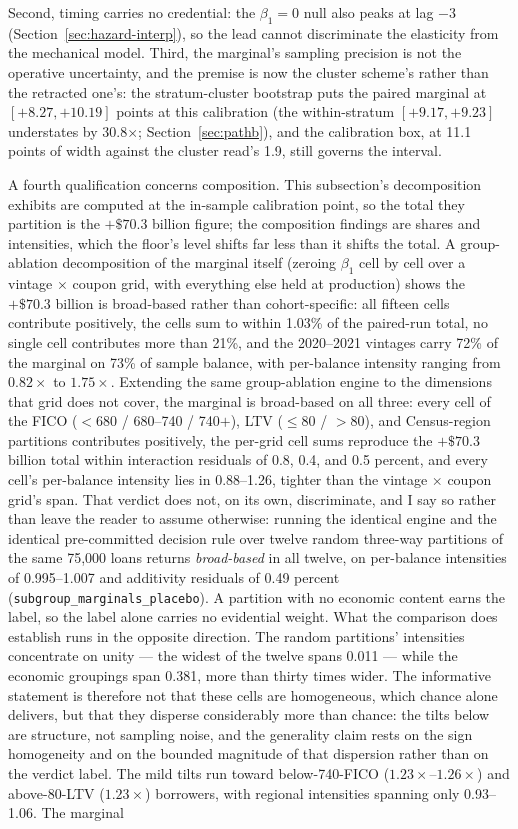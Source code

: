 \documentclass[12pt]{article}
\begin{document}
Second, timing carries no credential: the $\beta_1 = 0$ null also peaks at lag $-3$ (Section~\ref{sec:hazard-interp}), so the lead cannot discriminate the elasticity from the mechanical model. Third, the marginal's sampling precision is not the operative uncertainty, and the premise is now the cluster scheme's rather than the retracted one's: the stratum-cluster bootstrap puts the paired marginal at $[+8.27, +10.19]$ points at this calibration (the within-stratum $[+9.17, +9.23]$ understates by 30.8$\times$; Section~\ref{sec:pathb}), and the calibration box, at 11.1 points of width against the cluster read's 1.9, still governs the interval.

A fourth qualification concerns composition. This subsection's decomposition exhibits are computed at the in-sample calibration point, so the total they partition is the $+\$70.3$ billion figure; the composition findings are shares and intensities, which the floor's level shifts far less than it shifts the total. A group-ablation decomposition of the marginal itself (zeroing $\beta_1$ cell by cell over a vintage $\times$ coupon grid, with everything else held at production) shows the $+\$70.3$ billion is broad-based rather than cohort-specific: all fifteen cells contribute positively, the cells sum to within 1.03\% of the paired-run total, no single cell contributes more than 21\%, and the 2020--2021 vintages carry 72\% of the marginal on 73\% of sample balance, with per-balance intensity ranging from $0.82\times$ to $1.75\times$. Extending the same group-ablation engine to the dimensions that grid does not cover, the marginal is broad-based on all three: every cell of the FICO ($<$680 / 680--740 / 740$+$), LTV ($\leq$80 / $>$80), and Census-region partitions contributes positively, the per-grid cell sums reproduce the $+\$70.3$ billion total within interaction residuals of 0.8, 0.4, and 0.5 percent, and every cell's per-balance intensity lies in 0.88--1.26, tighter than the vintage $\times$ coupon grid's span. That verdict does not, on its own, discriminate, and I say so rather than leave the reader to assume otherwise: running the identical engine and the identical pre-committed decision rule over twelve random three-way partitions of the same 75,000 loans returns \emph{broad-based} in all twelve, on per-balance intensities of 0.995--1.007 and additivity residuals of 0.49 percent (\texttt{subgroup\_marginals\_placebo}). A partition with no economic content earns the label, so the label alone carries no evidential weight. What the comparison does establish runs in the opposite direction. The random partitions' intensities concentrate on unity --- the widest of the twelve spans 0.011 --- while the economic groupings span 0.381, more than thirty times wider. The informative statement is therefore not that these cells are homogeneous, which chance alone delivers, but that they disperse considerably more than chance: the tilts below are structure, not sampling noise, and the generality claim rests on the sign homogeneity and on the bounded magnitude of that dispersion rather than on the verdict label. The mild tilts run toward below-740-FICO ($1.23\times$--$1.26\times$) and above-80-LTV ($1.23\times$) borrowers, with regional intensities spanning only 0.93--1.06. The marginal 
\end{document}

